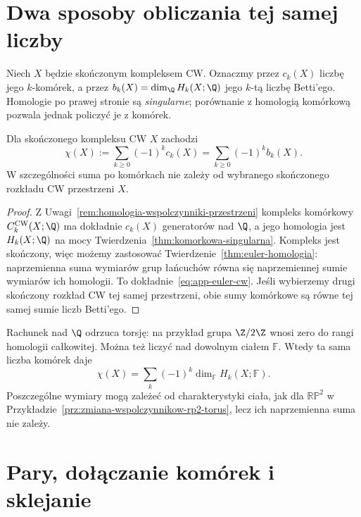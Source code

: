 \section{Dwa sposoby obliczania tej samej liczby}
\label{sec:app-euler-dwa-rachunki}

Niech $X$ będzie skończonym kompleksem CW. Oznaczmy przez $c_k(X)$
liczbę jego $k$-komórek, a przez
$b_k(X)=\dim_{\Q}H_k(X;\Q)$ jego $k$-tą liczbę Betti'ego.
Homologie po prawej stronie są \emph{singularne}; porównanie
z homologią komórkową pozwala jednak policzyć je z komórek.

\begin{stwierdzenie}
\label{prop:app-euler-cw}
Dla skończonego kompleksu CW $X$ zachodzi
\begin{equation}\label{eq:app-euler-cw}
 \chi(X):=\sum_{k\geq0}(-1)^k c_k(X)
 =\sum_{k\geq0}(-1)^k b_k(X).
\end{equation}
W szczególności suma po komórkach nie zależy od wybranego skończonego
rozkładu CW przestrzeni $X$.
\end{stwierdzenie}
\begin{proof}
Z Uwagi~\ref{rem:homologia-wspolczynniki-przestrzeni} kompleks
komórkowy $C_k^{\mathrm{CW}}(X;\Q)$ ma dokładnie $c_k(X)$ generatorów
nad $\Q$, a jego homologia jest $H_k(X;\Q)$ na mocy
Twierdzenia~\ref{thm:komorkowa-singularna}. Kompleks jest skończony,
więc możemy zastosować Twierdzenie~\ref{thm:euler-homologia}:
naprzemienna suma wymiarów grup łańcuchów równa się naprzemiennej
sumie wymiarów ich homologii. To dokładnie~\eqref{eq:app-euler-cw}.
Jeśli wybierzemy drugi skończony rozkład CW tej samej przestrzeni,
obie sumy komórkowe są równe tej samej sumie liczb Betti'ego.
\end{proof}

Rachunek nad $\Q$ odrzuca torsję: na przykład grupa $\Z/2\Z$
wnosi zero do rangi homologii całkowitej. Można też liczyć nad dowolnym
ciałem $\mathbb F$. Wtedy ta sama liczba komórek daje
\begin{equation}\label{eq:app-euler-cialo}
 \chi(X)=\sum_k(-1)^k\dim_{\mathbb F}H_k(X;\mathbb F).
\end{equation}
Poszczególne wymiary mogą zależeć od charakterystyki ciała,
jak dla $\mathbb{RP}^2$ w Przykładzie~\ref{prz:zmiana-wspolczynnikow-rp2-torus},
lecz ich naprzemienna suma nie zależy.

\section{Pary, dołączanie komórek i sklejanie}
\label{sec:app-euler-sklejanie}


